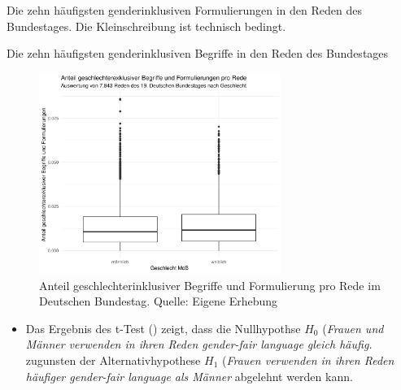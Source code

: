 \documentclass[12pt, 
    twoside=false, 
    bibliography=totoc, 
    numbers=endperiod, 
    headings=normal, 
    toc=chapterentrydotfill
    ]{scrbook}
\begin{document}
%

\begin{table}
    \centering
    \caption[Die zehn häufigsten genderinklusiven Formulierungen in den Reden des Bundestages]{Die zehn häufigsten genderinklusiven Formulierungen in den Reden des Bundestages. Die Kleinschreibung ist technisch bedingt.}
    
    \label{table:top_gender_phrasen}
\end{table}

\begin{table}
    \centering
    \caption[Die zehn häufigsten genderinklusiven Begriffe in den Reden des Bundestages]{Die zehn häufigsten genderinklusiven Begriffe in den Reden des Bundestages}
    
    \label{table:top_gender_begriffe}
\end{table}

\begin{figure}
    \centering
    \includegraphics[width=0.7\textwidth]{document/images/boxplot_gfl.pdf}
    \caption[Anteil geschlechterinklusiver Begriffe und Formulierung pro Rede im Deutschen Bundestag]{Anteil geschlechterinklusiver Begriffe und Formulierung pro Rede im Deutschen Bundestag. Quelle: Eigene Erhebung}
    \label{fig:boxplot_gfl}
\end{figure}

\begin{itemize}
    \item Das Ergebnis des t-Test () zeigt, dass die Nullhypothse $H_0$ (\emph{Frauen und Männer verwenden in ihren Reden gender-fair language gleich häufig.} zugunsten der Alternativhypothese $H_1$ (\emph{Frauen verwenden in ihren Reden häufiger gender-fair language als Männer} abgelehnt werden kann.
\end{itemize}
\end{document}
